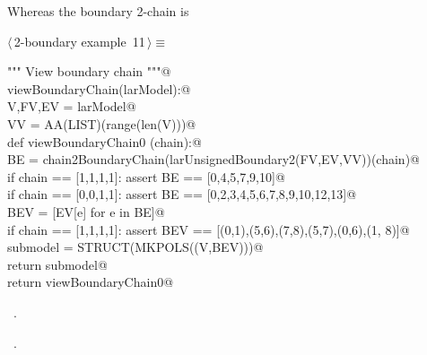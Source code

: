 \documentclass[11pt,oneside]{article}    %
\begin{document}
Whereas the boundary 2-chain is
\begin{flushleft} \small \label{scrap19}
\protect{}$\langle\,$2-boundary example\nobreak\ {\footnotesize 11}$\,\rangle\equiv$
\vspace{-1ex}
\begin{list}{}{} \item
\mbox{}\verb@""" View boundary chain """@\\
\mbox{}\verb@def viewBoundaryChain(larModel):@\\
\mbox{}\verb@    V,FV,EV = larModel@\\
\mbox{}\verb@    VV = AA(LIST)(range(len(V)))@\\
\mbox{}\verb@    def viewBoundaryChain0 (chain):@\\
\mbox{}\verb@        BE = chain2BoundaryChain(larUnsignedBoundary2(FV,EV,VV))(chain)@\\
\mbox{}\verb@        if chain == [1,1,1,1]: assert BE == [0,4,5,7,9,10]@\\
\mbox{}\verb@        if chain == [0,0,1,1]: assert BE == [0,2,3,4,5,6,7,8,9,10,12,13]@\\
\mbox{}\verb@        BEV = [EV[e] for e in BE]@\\
\mbox{}\verb@        if chain == [1,1,1,1]: assert BEV == [(0,1),(5,6),(7,8),(5,7),(0,6),(1, 8)]@\\
\mbox{}\verb@        submodel = STRUCT(MKPOLS((V,BEV)))@\\
\mbox{}\verb@        return submodel@\\
\mbox{}\verb@    return viewBoundaryChain0@\\
\mbox{}\verb@@{\NWsep}
\end{list}
\vspace{-1ex}
\footnotesize\addtolength{\baselineskip}{-1ex}
\begin{list}{}{\setlength{\itemsep}{-\parsep}\setlength{\itemindent}{-\leftmargin}}
\item \NWtxtMacroDefBy\ .
\item \NWtxtMacroRefIn\ .
\end{list}
\end{flushleft}
\end{document}
